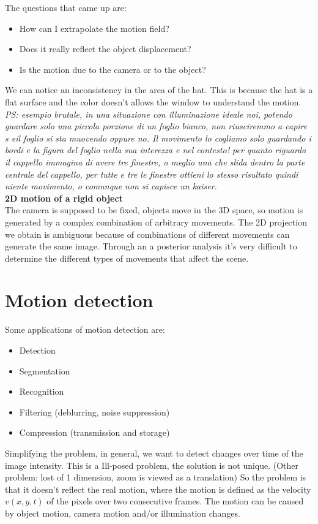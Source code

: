 The questions that came up are:
\begin{itemize}
    \item How can I extrapolate the motion field?
    \item Does it really reflect the object displacement?
    \item Is the motion due to the camera or to the object?
\end{itemize}
We can notice an inconsistency in the area of the hat. This is because the hat is a flat surface and the color doesn't allows the window to understand the motion. 
\\\textit{PS: esempio brutale, in una situazione con illuminazione ideale noi, potendo guardare solo una piccola porzione di un foglio bianco, non riusciremmo a capire s eil foglio si sta muovendo oppure no. Il movimento lo cogliamo solo guardando i bordi e la figura del foglio nella sua interezza e nel contesto! per quanto riguarda il cappello immagina di avere tre finestre, o meglio una che slida dentro la parte centrale del cappello, per tutte e tre le finestre ottieni lo stesso risultato quindi niente movimento, o comunque non si capisce un kaiser.}
\\\textbf{2D motion of a rigid object}
\\ The camera is supposed to be fixed, objects move in the 3D space, so motion is generated by a complex combination of arbitrary movements. The 2D projection we obtain is ambiguous because of combinations of different movements can generate the same image. Through an a posterior analysis it’s very difficult to determine the different types of movements that affect the scene.
\section{Motion detection}
Some applications of motion detection are:
\begin{itemize}
    \item Detection
    \item Segmentation
    \item Recognition
    \item Filtering (deblurring, noise suppression)
    \item Compression (transmission and storage)
\end{itemize}
Simplifying the problem, in general, we want to detect changes over time of the image intensity.
This is a  Ill-posed problem, the solution is not unique. (Other problem: lost of 1 dimension, zoom is viewed as a translation)
So the problem is that it doesn't reflect the real motion, where the motion is defined as the velocity $v(x,y,t)$ of the pixels over two consecutive frames.
The motion can be caused by object motion, camera motion and/or illumination changes.
